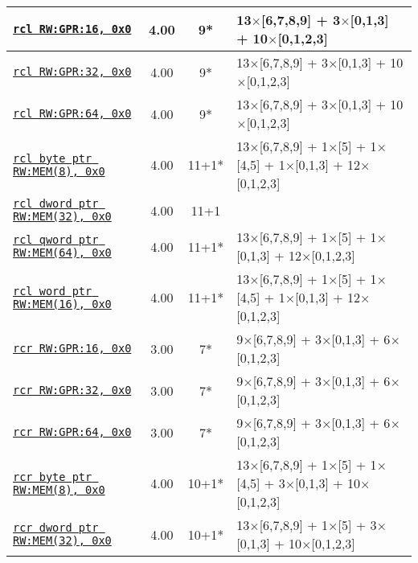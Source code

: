 \documentclass[a4paper,english,fontsize=9]{scrartcl}
\begin{document}
\begin{longtable}{p{}ccL{.25\textwidth}}
  \midrule
  \texttt{\href{https://felixcloutier.com/x86/RCL:RCR:ROL:ROR.html}{rcl RW:GPR:16, 0x0}} & 4.00 & 9* & 13\(\times\)[6,7,8,9] + 3\(\times\)[0,1,3] + 10\(\times\)[0,1,2,3] \\
  \midrule
  \texttt{\href{https://felixcloutier.com/x86/RCL:RCR:ROL:ROR.html}{rcl RW:GPR:32, 0x0}} & 4.00 & 9* & 13\(\times\)[6,7,8,9] + 3\(\times\)[0,1,3] + 10\(\times\)[0,1,2,3] \\
  \midrule
  \texttt{\href{https://felixcloutier.com/x86/RCL:RCR:ROL:ROR.html}{rcl RW:GPR:64, 0x0}} & 4.00 & 9* & 13\(\times\)[6,7,8,9] + 3\(\times\)[0,1,3] + 10\(\times\)[0,1,2,3] \\
  \midrule
  \texttt{\href{https://felixcloutier.com/x86/RCL:RCR:ROL:ROR.html}{rcl byte ptr RW:MEM(8), 0x0}} & 4.00 & 11+1* & 13\(\times\)[6,7,8,9] + 1\(\times\)[5] + 1\(\times\)[4,5] + 1\(\times\)[0,1,3] + 12\(\times\)[0,1,2,3] \\
  \midrule
  \texttt{\href{https://felixcloutier.com/x86/RCL:RCR:ROL:ROR.html}{rcl dword ptr RW:MEM(32), 0x0}} & 4.00 & 11+1 &  \\
  \midrule
  \texttt{\href{https://felixcloutier.com/x86/RCL:RCR:ROL:ROR.html}{rcl qword ptr RW:MEM(64), 0x0}} & 4.00 & 11+1* & 13\(\times\)[6,7,8,9] + 1\(\times\)[5] + 1\(\times\)[0,1,3] + 12\(\times\)[0,1,2,3] \\
  \midrule
  \texttt{\href{https://felixcloutier.com/x86/RCL:RCR:ROL:ROR.html}{rcl word ptr RW:MEM(16), 0x0}} & 4.00 & 11+1* & 13\(\times\)[6,7,8,9] + 1\(\times\)[5] + 1\(\times\)[4,5] + 1\(\times\)[0,1,3] + 12\(\times\)[0,1,2,3] \\
  \midrule
  \texttt{\href{https://felixcloutier.com/x86/RCL:RCR:ROL:ROR.html}{rcr RW:GPR:16, 0x0}} & 3.00 & 7* & 9\(\times\)[6,7,8,9] + 3\(\times\)[0,1,3] + 6\(\times\)[0,1,2,3] \\
  \midrule
  \texttt{\href{https://felixcloutier.com/x86/RCL:RCR:ROL:ROR.html}{rcr RW:GPR:32, 0x0}} & 3.00 & 7* & 9\(\times\)[6,7,8,9] + 3\(\times\)[0,1,3] + 6\(\times\)[0,1,2,3] \\
  \midrule
  \texttt{\href{https://felixcloutier.com/x86/RCL:RCR:ROL:ROR.html}{rcr RW:GPR:64, 0x0}} & 3.00 & 7* & 9\(\times\)[6,7,8,9] + 3\(\times\)[0,1,3] + 6\(\times\)[0,1,2,3] \\
  \midrule
  \texttt{\href{https://felixcloutier.com/x86/RCL:RCR:ROL:ROR.html}{rcr byte ptr RW:MEM(8), 0x0}} & 4.00 & 10+1* & 13\(\times\)[6,7,8,9] + 1\(\times\)[5] + 1\(\times\)[4,5] + 3\(\times\)[0,1,3] + 10\(\times\)[0,1,2,3] \\
  \midrule
  \texttt{\href{https://felixcloutier.com/x86/RCL:RCR:ROL:ROR.html}{rcr dword ptr RW:MEM(32), 0x0}} & 4.00 & 10+1* & 13\(\times\)[6,7,8,9] + 1\(\times\)[5] + 3\(\times\)[0,1,3] + 10\(\times\)[0,1,2,3] \\

\end{longtable}
\end{document}
